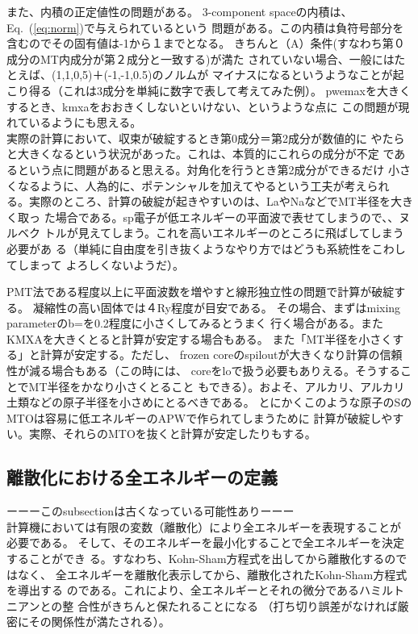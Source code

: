 \documentclass[twocolumn,showpacs,preprintnumbers,amsmath,amssymb,floatfix]{revtex4-1}
\newcommand{\req}[1]{\mbox{Eq.~\!(\ref{#1})}}
\begin{document}
また、内積の正定値性の問題がある。
3-component spaceの内積は、\req{eq:norm}で与えられているという
問題がある。この内積は負符号部分を含むのでその固有値は-1から１までとなる。
きちんと（A）条件(すなわち第０成分のMT内成分が第２成分と一致する)が満た
されていない場合、一般にはたとえば、(1,1,0,5)＋(-1,-1,0.5)のノルムが
マイナスになるというようなことが起こり得る（これは3成分を単純に数字で表して考えてみた例）。
pwemaxを大きくするとき、kmxaをおおきくしないといけない、というような点に
この問題が現れているようにも思える。\\

実際の計算において、収束が破綻するとき第0成分＝第2成分が数値的に
やたらと大きくなるという状況があった。これは、本質的にこれらの成分が不定
であるという点に問題があると思える。対角化を行うとき第2成分ができるだけ
小さくなるように、人為的に、ポテンシャルを加えてやるという工夫が考えられ
る。実際のところ、計算の破綻が起きやすいのは、LaやNaなどでMT半径を大きく取っ
た場合である。sp電子が低エネルギーの平面波で表せてしまうので、、ヌルベク
トルが見えてしまう。これを高いエネルギーのところに飛ばしてしまう必要があ
る（単純に自由度を引き抜くようなやり方ではどうも系統性をこわしてしまって
よろしくないようだ）。

PMT法である程度以上に平面波数を増やすと線形独立性の問題で計算が破綻する。
凝縮性の高い固体では４Ry程度が目安である。
その場合、まずはmixing parameterのb=を0.2程度に小さくしてみるとうまく
行く場合がある。またKMXAを大きくとると計算が安定する場合もある。
また「MT半径を小さくする」と計算が安定する。ただし、
frozen coreのspiloutが大きくなり計算の信頼性が減る場合もある（この時には、
coreをloで扱う必要もありえる。そうすることでMT半径をかなり小さくとること
もできる）。およそ、アルカリ、アルカリ土類などの原子半径を小さめにとるべきである。
とにかくこのような原子のSのMTOは容易に低エネルギーのAPWで作られてしまうために
計算が破綻しやすい。実際、それらのMTOを抜くと計算が安定したりもする。


\subsection{離散化における全エネルギーの定義}
ーーーこのsubsectionは古くなっている可能性ありーーー\\
計算機においては有限の変数（離散化）により全エネルギーを表現することが
必要である。
そして、そのエネルギーを最小化することで全エネルギーを決定することができ
る。すなわち、Kohn-Sham方程式を出してから離散化するのではなく、
全エネルギーを離散化表示してから、離散化されたKohn-Sham方程式を導出する
のである。これにより、全エネルギーとそれの微分であるハミルトニアンとの整
合性がきちんと保たれることになる
（打ち切り誤差がなければ厳密にその関係性が満たされる）。
\end{document}
